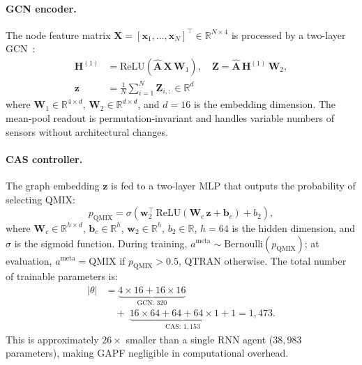 \paragraph{GCN encoder.}
The node feature matrix $\mathbf{X} = [\mathbf{x}_1, \dots, \mathbf{x}_N]^\top \in \mathbb{R}^{N \times 4}$ is processed by a two-layer GCN~\cite{kipf2017semi}:
\begin{align}
    \mathbf{H}^{(1)} &= \text{ReLU}(\hat{\mathbf{A}}\,\mathbf{X}\,\mathbf{W}_1), \quad
    \mathbf{Z} = \hat{\mathbf{A}}\,\mathbf{H}^{(1)}\,\mathbf{W}_2, \nonumber\\
    \mathbf{z} &= \tfrac{1}{N}\textstyle\sum_{i=1}^{N} \mathbf{Z}_{i,:} \in \mathbb{R}^{d}
    \label{eq:gcn}
\end{align}
where $\mathbf{W}_1 \in \mathbb{R}^{4 \times d}$, $\mathbf{W}_2 \in \mathbb{R}^{d \times d}$, and $d = 16$ is the embedding dimension. The mean-pool readout is permutation-invariant and handles variable numbers of sensors without architectural changes.

\paragraph{CAS controller.}
The graph embedding $\mathbf{z}$ is fed to a two-layer MLP that outputs the probability of selecting QMIX:
\begin{equation}
    p_{\text{QMIX}} = \sigma\!\left(\mathbf{w}_2^\top\,\text{ReLU}\!\left(\mathbf{W}_c\,\mathbf{z} + \mathbf{b}_c\right) + b_2\right),
    \label{eq:cas_controller}
\end{equation}
where $\mathbf{W}_c \in \mathbb{R}^{h \times d}$, $\mathbf{b}_c \in \mathbb{R}^h$, $\mathbf{w}_2 \in \mathbb{R}^h$, $b_2 \in \mathbb{R}$, $h = 64$ is the hidden dimension, and $\sigma$ is the sigmoid function. During training, $a^{\text{meta}} \sim \text{Bernoulli}(p_{\text{QMIX}})$; at evaluation, $a^{\text{meta}} = \text{QMIX}$ if $p_{\text{QMIX}} > 0.5$, QTRAN otherwise. The total number of trainable parameters is:
\begin{align}
    |\theta| &= \underbrace{4 \times 16 + 16 \times 16}_{\text{GCN: } 320} \nonumber\\
             &\quad+\; \underbrace{16 \times 64 + 64 + 64 \times 1 + 1}_{\text{CAS: } 1{,}153} = 1{,}473.
    \label{eq:param_count}
\end{align}
This is approximately $26\times$ smaller than a single RNN agent ($38{,}983$ parameters), making GAPF negligible in computational overhead.

